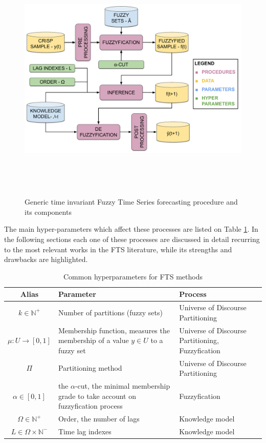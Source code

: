 \begin{figure}
    \centering
    \includegraphics[width=\textwidth,height=12cm]{figures/fts_forecasting.pdf}
    \caption{Generic time invariant Fuzzy Time Series forecasting procedure and its components}
    \label{fig:fts_forecasting}
\end{figure}


The main hyper-parameters which affect these processes are listed on Table \ref{tab:fts_hyperparameters}. In the following sections each one of these processes are discussed in detail recurring to the most relevant works in the FTS literature, while its strengths and drawbacks are highlighted.

\begin{table}[]
    \centering
    \begin{tabular}{|c|m{7cm}|m{5cm}|} \hline
        \textbf{Alias} & \textbf{Parameter}& \textbf{Process} \\ \hline
         $k \in \mathbb{N}^+$ & Number of partitions (fuzzy sets) & Universe of Discourse Partitioning \\ \hline
         $\mu: U \rightarrow [0,1] $ & Membership function, measures the membership of a value $y \in U$ to a fuzzy set & Universe of Discourse Partitioning, Fuzzyfication  \\\hline
         $\Pi$ & Partitioning method & Universe of Discourse Partitioning \\\hline
         $\alpha \in [0,1]$ & the $\alpha$-cut, the minimal membership grade to take account on fuzzyfication process & Fuzzyfication \\ \hline
         $\Omega \in \mathbb{N}^+$ & Order, the number of lags & Knowledge model  \\\hline
         $L \in \Omega \times \mathbb{N}^-$ & Time lag indexes & Knowledge model \\\hline
    \end{tabular}
    \caption{Common hyperparameters for FTS methods}
    \label{tab:fts_hyperparameters}
\end{table}

